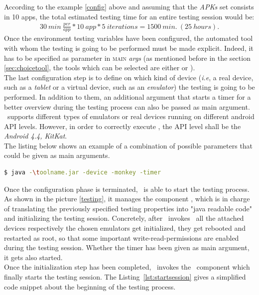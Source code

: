 According to the example \ref{config} above and assuming that the \textit{APKs} set consists in 10 apps, the total estimated testing time for an entire testing session would be: 
\begin{align*}
30 \:min \: \frac{per}{app} * 10\: app * 5\: iterations = 1500 \:min. \:(25\: hours). 
\end{align*}
Once the environment testing variables have been configured, the automated tool with whom the testing is going to be performed must be made explicit. Indeed, it has to be specified as parameter in \textsc{main} \textit{args} (as mentioned before in the section \ref{sec:choicetool}, the tools which can be selected are either \monkey or \sapienz). \\
The last configuration step is to define on which kind of device (\textit{i.e}, a real device, such as a \textit{tablet} or a virtual device, such as an \textit{emulator}) the testing is going to be performed. In addition to them, an additional argument that starts a timer for a better overview during the testing process can also be passed as main argument. \toolname\ supports different types of emulators or real devices running on different android API levels. However, in order to correctly execute \sapienz, the API level shall be the \textit{Android 4.4, KitKat}. \\
The listing below shows an example of a combination of possible parameters that could be given as main arguments. 


\begin{lstlisting}[caption=\toolname\ command line, language=bash]
$ java -\toolname.jar -device -monkey -timer
\end{lstlisting}

Once the configuration phase is terminated, \toolname\ is able to start the testing process. 
As shown in the picture \ref{testing}, it manages the component \SessionLauncher, which is in charge of translating the previously specified testing properties into "java readable code" and initializing the testing session. 
Concretely, after \toolname\ invokes \SessionLauncher\ all the attached devices respectively the chosen emulators get initialized, \ie they get rebooted and restarted as root, so that some important write-read-permissions are enabled during the testing session. 
Whether the timer has been given as main argument, it gets also started. \\
Once the initialization step has been completed, \SessionLauncher\  invokes the \AppTester\ component which finally starts the testing session. The Listing~\ref{lst:startsession} gives a simplified code snippet about the beginning of the testing process. 


